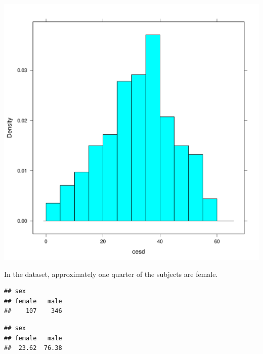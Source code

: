 \begin{center}
\begin{knitrout}
\color{fgcolor}\begin{kframe}
\begin{alltt}
\hlstd{(}\hlopt{~}  \hlstd{=}\hlstd{,} \hlstd{=}\hlstd{,} 
\end{alltt}
\end{kframe}
\includegraphics[width=\maxwidth]{figure/cesd-hist2-1} 

\end{knitrout}
\end{center}


%
%
In the  dataset, approximately one quarter of the subjects are female.  
\begin{knitrout}
\color{fgcolor}\begin{kframe}
\begin{alltt}
\hlstd{(}\hlopt{~}  
\end{alltt}
\begin{verbatim}
## sex
## female   male 
##    107    346
\end{verbatim}
\begin{alltt}
\hlstd{(}\hlopt{~}  \hlstd{=}\hlstd{,} 
\end{alltt}
\begin{verbatim}
## sex
## female   male 
##  23.62  76.38
\end{verbatim}
\end{kframe}
\end{knitrout}


